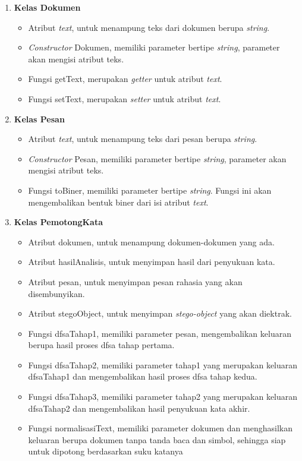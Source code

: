 \begin{enumerate}
	\item \textbf{Kelas Dokumen}
	\begin{itemize}
		\item Atribut \textit{text}, untuk menampung teks dari dokumen berupa \textit{string}.
		\item \textit{Constructor} Dokumen, memiliki parameter bertipe \textit{string}, parameter akan mengisi atribut teks.
		\item Fungsi getText, merupakan \textit{getter} untuk atribut \textit{text}.
		\item Fungsi setText, merupakan \textit{setter} untuk atribut \textit{text}.		
	\end{itemize}
	\item \textbf{Kelas Pesan}
	\begin{itemize}
		\item Atribut \textit{text}, untuk menampung teks dari pesan berupa \textit{string}.
		\item \textit{Constructor} Pesan, memiliki parameter bertipe \textit{string}, parameter akan mengisi atribut teks.
		\item Fungsi toBiner, memiliki parameter bertipe \textit{string}. Fungsi ini akan mengembalikan bentuk biner dari isi atribut \textit{text}.
	\end{itemize}
	\item \textbf{Kelas PemotongKata}
	\begin{itemize}
		\item Atribut dokumen, untuk menampung dokumen-dokumen yang ada.
		\item Atribut hasilAnalisis, untuk menyimpan hasil dari penyukuan kata.
		\item Atribut pesan, untuk menyimpan pesan rahasia yang akan disembunyikan.
		\item Atribut stegoObject, untuk menyimpan \textit{stego-object} yang akan diektrak.
		\item Fungsi dfsaTahap1, memiliki parameter pesan, mengembalikan keluaran berupa hasil proses dfsa tahap pertama.
		\item Fungsi dfsaTahap2, memiliki parameter tahap1 yang merupakan keluaran dfsaTahap1 dan mengembalikan hasil proses dfsa tahap kedua.
		\item Fungsi dfsaTahap3, memiliki parameter tahap2 yang merupakan keluaran dfsaTahap2 dan mengembalikan hasil penyukuan kata akhir.
		\item Fungsi normalisasiText, memiliki parameter dokumen dan menghasilkan keluaran berupa dokumen tanpa tanda baca dan simbol, sehingga siap untuk dipotong berdasarkan suku katanya

\end{itemize}
\end{enumerate}
